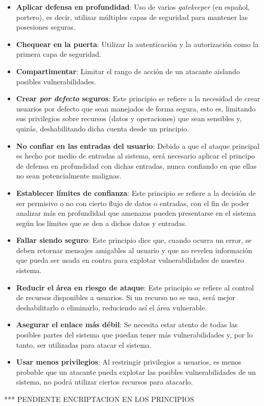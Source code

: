 \begin{itemize}
 \item \textbf{Aplicar defensa en profundidad}: Uso de varios \textit{gatekeeper} (en español, portero), es decir, utilizar múltiples capas de seguridad para mantener las posesiones seguras.
 \item \textbf{Chequear en la puerta}: Utilizar la autenticación y la autorización como la primera capa de seguridad.
 \item \textbf{Compartimentar}: Limitar el rango de acción de un atacante aislando posibles vulnerabilidades.
 \item \textbf{Crear \textit{por defecto} seguros}: Este principio se refiere a la necesidad de crear usuarios por defecto que sean manejados de forma segura, esto es, limitando sus privilegios sobre recursos (datos y operaciones) que sean sensibles y, quizás, deshabilitando dicha cuenta desde un principio.
 \item \textbf{No confiar en las entradas del usuario}: Debido a que el ataque principal es hecho por medio de entradas al sistema, será necesario aplicar el principo de defensa en profundidad con dichas entradas, nunca confiando en que ellas no sean potencialmente malignas.
 \item \textbf{Establecer límites de confianza}: Este principio se refiere a la decisión de ser permisivo o no con cierto flujo de datos o entradas, con el fin de poder analizar más en profundidad que amenazas pueden presentarse en el sistema según los límites que se den a dichos datos y entradas.
 \item \textbf{Fallar siendo seguro}: Este principio dice que, cuando ocurra un error, se deben retornar mensajes amigables al usuario y que no revelen información que pueda ser usada en contra para explotar vulnerabilidades de nuestro sistema.
 \item \textbf{Reducir el área en riesgo de ataque}: Este principio se refiere al control de recursos disponibles a usuarios. Si un recurso no se usa, será mejor deshabilitarlo o eliminarlo, reduciendo así el área vulnerable.
 \item \textbf{Asegurar el enlace más débil}: Se necesita estar atento de todas las posibles partes del sistema que puedan tener más vulnerabilidades y, por lo tanto, ser utilizadas para atacar el sistema.
 \item \textbf{Usar menos privilegios}: Al restringir privilegios a usuarios, es menos probable que un atacante pueda explotar las posibles vulnerabilidades de un sistema, no podrá utilizar ciertos recursos para atacarlo.
\end{itemize}

*** PENDIENTE ENCRIPTACION EN LOS PRINCIPIOS